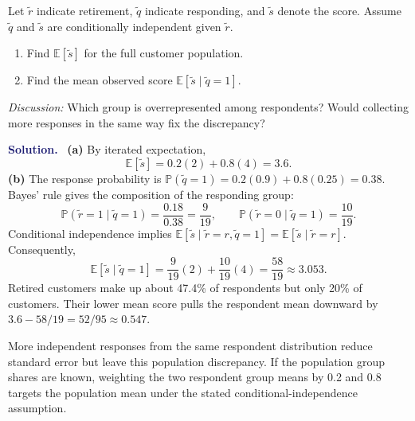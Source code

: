 \documentclass[11pt]{article}
\newcommand{\rv}[1]{\widetilde{#1}}
\newcommand{\E}{\mathbb E}
\newcommand{\Pbb}{\mathbb P}
\newenvironment{answer}{\par\medskip\noindent\textcolor{MidnightBlue}{\textbf{Solution.}}\ }{\par\medskip}
\newcommand{\workingspace}[1]{}
\newcommand{\workingspace}[1]{\vspace{#1}}
\begin{document}
Let $\rv r$ indicate retirement, $\rv q$ indicate responding, and $\rv s$
denote the score. Assume $\rv q$ and $\rv s$ are conditionally independent
given $\rv r$.
\begin{enumerate}
 \item Find $\E[\rv s]$ for the full customer population.
 \item Find the mean observed score $\E[\rv s\mid\rv q=1]$.
\end{enumerate}
\noindent\textit{Discussion:} Which group is overrepresented among respondents?
Would collecting more responses in the same way fix the discrepancy?
\workingspace{9cm}
\begin{answer}
\textbf{(a)} By iterated expectation,
\[
 \boxed{\E[\rv s]=0.2(2)+0.8(4)=3.6.}
\]
\textbf{(b)} The response probability is
$\Pbb(\rv q=1)=0.2(0.9)+0.8(0.25)=0.38$.
Bayes' rule gives the composition of the responding group:
\[
 \Pbb(\rv r=1\mid\rv q=1)=\frac{0.18}{0.38}=\frac9{19},\qquad
 \Pbb(\rv r=0\mid\rv q=1)=\frac{10}{19}.
\]
Conditional independence implies
$\E[\rv s\mid\rv r=r,\rv q=1]=\E[\rv s\mid\rv r=r]$.
Consequently,
\[
 \boxed{\E[\rv s\mid\rv q=1]
 =\frac9{19}(2)+\frac{10}{19}(4)=\frac{58}{19}\approx3.053.}
\]
Retired customers make up about 47.4\% of respondents but only 20\% of
customers. Their lower mean score pulls the respondent mean downward by
$3.6-58/19=52/95\approx0.547$.

More independent responses from the same respondent distribution reduce
standard error but leave this population discrepancy. If the population
group shares are known, weighting the two respondent group means by 0.2
and 0.8 targets the population mean under the stated conditional-independence assumption.
\end{answer}

\newpage
\end{document}
